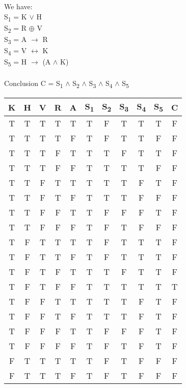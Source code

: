 \documentclass[12pt,en,a4paper]{article}
\begin{document}
	We have:\\
	S\textsubscript{1} = K $\vee$ H\\
	S\textsubscript{2} = R $\oplus$ V\\
	S\textsubscript{3} = A $\rightarrow$ R\\
	S\textsubscript{4} = V $\leftrightarrow$ K\\
	S\textsubscript{5} = H $\rightarrow$ (A $\wedge$ K)\\\\
	Conclusion C = S\textsubscript{1} $\wedge$ S\textsubscript{2} $\wedge$ S\textsubscript{3} $\wedge$ S\textsubscript{4} $\wedge$ S\textsubscript{5}
	
	\begin{tabular}{|c|c|c|c|c|c|c|c|c|c|c|}
		\hline
		K & H & V & R & A & S\textsubscript{1} & S\textsubscript{2} & S\textsubscript{3} & 
		S\textsubscript{4} & 
		S\textsubscript{5} & 
		C\\
		\hline
		T & T & T & T & T & T & F & T & T & T & F\\
		\hline
		T & T & T & T & F & T & F & T & T & F & F\\
		\hline
		T & T & T & F & T & T & T & F & T & T & F\\
		\hline
		T & T & T & F & F & T & T & T & T & F & F\\
		\hline
		T & T & F & T & T & T & T & T & F & T & F\\
		\hline
		T & T & F & T & F & T & T & T & F & F & F\\
		\hline
		T & T & F & F & T & T & F & F & F & T & F\\
		\hline
		T & T & F & F & F & T & F & T & F & F & F\\
		\hline
		T & F & T & T & T & T & F & T & T & T & F\\
		\hline
		T & F & T & T & F & T & F & T & T & T & F\\
		\hline
		T & F & T & F & T & T & T & F & T & T & F\\
		\hline
		T & F & T & F & F & T & T & T & T & T & T\\
		\hline
		T & F & F & T & T & T & T & T & F & T & F\\
		\hline
		T & F & F & T & F & T & T & T & F & T & F\\
		\hline
		T & F & F & F & T & T & F & F & F & T & F\\
		\hline
		T & F & F & F & F & T & F & T & F & T & F\\
		\hline
		F & T & T & T & T & T & F & T & F & F & F\\
		\hline
		F & T & T & T & F & T & F & T & F & F & F\\

\end{tabular}
\end{document}
